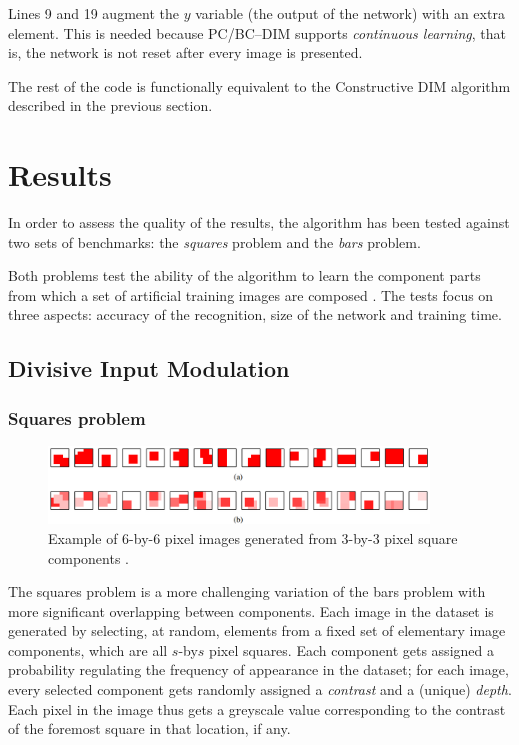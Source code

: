 \documentclass[11pt,a4paper]{report}
\begin{document}
				Lines 9 and 19 augment the $y$ variable (the output of the network) with an extra element. This is needed because PC/BC--DIM supports \emph{continuous learning}, that is, the network is not reset after every image is presented.
				
				The rest of the code is functionally equivalent to the Constructive DIM algorithm described in the previous section.
			
		\section{Results}
			In order to assess the quality of the results, the algorithm has been tested against two sets of benchmarks: the \emph{squares} problem and the \emph{bars} problem.
			
			Both problems test the ability of the algorithm to learn the component parts from which a set of artificial training images are composed \cite{spratling2009unsupervised,spratling2012unsupervised}. The tests focus on three aspects: accuracy of the recognition, size of the network and training time.
			
			\subsection{Divisive Input Modulation}
				\subsubsection{Squares problem}
				\begin{figure}[h]
					\centering
					\includegraphics[width=0.9\textwidth]{squares}
					\caption{Example of 6-by-6 pixel images generated from 3-by-3 pixel square components \cite{spratling2009unsupervised}.}
					\label{fig:error}
				\end{figure}
				The squares problem is a more challenging variation of the bars problem with more significant overlapping between components. Each image in the dataset is generated by selecting, at random, elements from a fixed set of elementary image components, which are all $s$-by$s$ pixel squares. Each component gets assigned a probability regulating the frequency of appearance in the dataset; for each image, every selected component gets randomly assigned a \emph{contrast} and a (unique) \emph{depth}. Each pixel in the image thus gets a greyscale value corresponding to the contrast of the foremost square in that location, if any.
				
\end{document}
